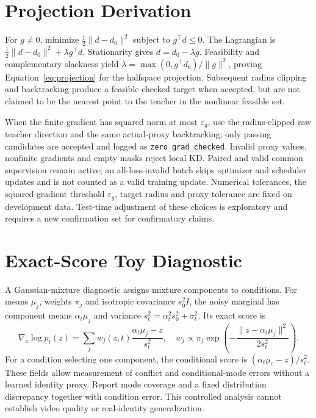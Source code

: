 \documentclass[11pt]{article}
\begin{document}
\section{Projection Derivation}
For $g\ne0$, minimize $\frac12\|d-d_0\|^2$ subject to $g^\top d\le0$. The Lagrangian is $\frac12\|d-d_0\|^2+\lambda g^\top d$. Stationarity gives $d=d_0-\lambda g$. Feasibility and complementary slackness yield $\lambda=\max(0,g^\top d_0)/\|g\|^2$, proving Equation~\ref{eq:projection} for the halfspace projection. Subsequent radius clipping and backtracking produce a feasible checked target when accepted, but are not claimed to be the nearest point to the teacher in the nonlinear feasible set.

When the finite gradient has squared norm at most $\varepsilon_g$, use the radius-clipped raw teacher direction and the same actual-proxy backtracking; only passing candidates are accepted and logged as \texttt{zero\_grad\_checked}. Invalid proxy values, nonfinite gradients and empty masks reject local KD. Paired and valid common supervision remain active; an all-loss-invalid batch skips optimizer and scheduler updates and is not counted as a valid training update. Numerical tolerances, the squared-gradient threshold $\varepsilon_g$, target radius and proxy tolerance are fixed on development data. Test-time adjustment of these choices is exploratory and requires a new confirmation set for confirmatory claims.

\section{Exact-Score Toy Diagnostic}
A Gaussian-mixture diagnostic assigns mixture components to conditions. For means $\mu_j$, weights $\pi_j$ and isotropic covariance $s_0^2 I$, the noisy marginal has component means $\alpha_t\mu_j$ and variance $s_t^2=\alpha_t^2s_0^2+\sigma_t^2$. Its exact score is
\begin{equation}
 \nabla_z\log p_t(z)=\sum_j w_j(z,t)
 \frac{\alpha_t\mu_j-z}{s_t^2},\quad
 w_j\propto\pi_j\exp\left(-\frac{\|z-\alpha_t\mu_j\|^2}{2s_t^2}\right).
\end{equation}
For a condition selecting one component, the conditional score is $(\alpha_t\mu_c-z)/s_t^2$. These fields allow measurement of conflict and conditional-mode errors without a learned identity proxy. Report mode coverage and a fixed distribution discrepancy together with condition error. This controlled analysis cannot establish video quality or real-identity generalization.
\end{document}
